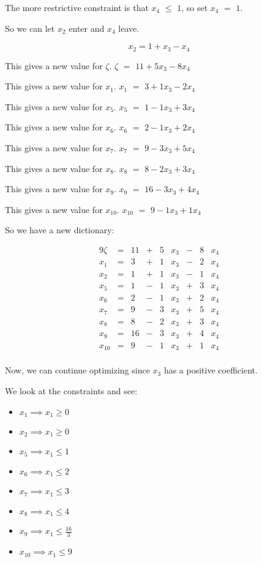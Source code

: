\documentclass[12pt,letterpaper]{article}
\newcommand*\seeconstraints{
  We look at the constraints and see:
}
\newcommand*\continueopt[1]{
  Now, we can continue optimizing since #1 has a positive coefficient.
}
\newcommand*\enterleave[2]{
  So we can let #1 enter and #2 leave.
}
\newcommand*\morerestrictive[2]{
  The more restrictive constraint is that #1 $\leq$ #2, so set #1 $=$ #2.
}
\newcommand*\newdict{
  So we have a new dictionary:
}
\newcommand*\newvalue[2]{
  This gives a new value for #1. #1 $ = $ #2
}
\begin{document}
\begin{enumerate}
      \morerestrictive{$x_4$}{$1$}

      \enterleave{$x_2$}{$x_4$}

      \[
        x_2 = 1 + x_3 - x_4
      \]

      \newvalue{$\zeta$}{$11 + 5 x_3 - 8 x_4$}

      \newvalue{$x_1$}{$3  + 1 x_3 - 2 x_4$}

      \newvalue{$x_5$}{$1  - 1 x_3 + 3 x_4$}

      \newvalue{$x_6$}{$2  - 1 x_3 + 2 x_4$}

      \newvalue{$x_7$}{$9  - 3 x_3 + 5 x_4$}

      \newvalue{$x_8$}{$8  - 2 x_3 + 3 x_4$}

      \newvalue{$x_9$}{$16 - 3 x_3 + 4 x_4$}

      \newvalue{$x_{10}$}{$9 - 1 x_3 + 1 x_4$}

      \newdict

      \begin{alignat*}{9}
        \zeta  & {}={} & 11 & {}+{} & 5 & x_3 & {}-{} & 8 & x_4 \\
        x_1    & {}={} & 3  & {}+{} & 1 & x_3 & {}-{} & 2 & x_4 \\
        x_2    & {}={} & 1  & {}+{} & 1 & x_3 & {}-{} & 1 & x_4 \\
        x_5    & {}={} & 1  & {}-{} & 1 & x_3 & {}+{} & 3 & x_4 \\
        x_6    & {}={} & 2  & {}-{} & 1 & x_3 & {}+{} & 2 & x_4 \\
        x_7    & {}={} & 9  & {}-{} & 3 & x_3 & {}+{} & 5 & x_4 \\
        x_8    & {}={} & 8  & {}-{} & 2 & x_3 & {}+{} & 3 & x_4 \\
        x_9    & {}={} & 16 & {}-{} & 3 & x_3 & {}+{} & 4 & x_4 \\
        x_{10} & {}={} & 9  & {}-{} & 1 & x_3 & {}+{} & 1 & x_4 \\
      \end{alignat*}

      \continueopt{$x_3$}

      \seeconstraints

      \begin{itemize}
        \item $x_1    \implies x_1 \geq 0$
        \item $x_2    \implies x_1 \geq 0$
        \item $x_5    \implies x_1 \leq 1$
        \item $x_6    \implies x_1 \leq 2$
        \item $x_7    \implies x_1 \leq 3$
        \item $x_8    \implies x_1 \leq 4$
        \item $x_9    \implies x_1 \leq \frac{16}{3}$
        \item $x_{10} \implies x_1 \leq 9$
      \end{itemize}


\end{enumerate}
\end{document}
